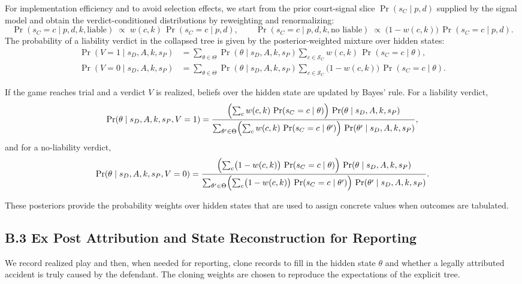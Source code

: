 \documentclass{article}
\begin{document}
For implementation efficiency and to avoid selection effects, we start from the prior court-signal slice $\Pr(s_C\mid p,d)$ supplied by the signal model and obtain the verdict-conditioned distributions by reweighting and renormalizing:
\[
\Pr(s_C=c\mid p,d,k,\text{liable}) \;\propto\; w(c,k)\,\Pr(s_C=c\mid p,d),\qquad
\Pr(s_C=c\mid p,d,k,\text{no liable}) \;\propto\; \bigl(1-w(c,k)\bigr)\,\Pr(s_C=c\mid p,d).
\]
The probability of a liability verdict in the collapsed tree is given by the posterior-weighted mixture over hidden states:
\begin{align*}
\Pr(V=1 \mid s_D, A, k, s_P)
  &= \sum_{\theta\in\Theta} 
       \Pr(\theta \mid s_D, A, k, s_P)
       \sum_{c\in\mathcal{S}_C} 
          w(c,k)\,\Pr(s_C=c\mid \theta), \\[6pt]
\Pr(V=0 \mid s_D, A, k, s_P)
  &= \sum_{\theta\in\Theta} 
       \Pr(\theta \mid s_D, A, k, s_P)
       \sum_{c\in\mathcal{S}_C} 
          \bigl(1-w(c,k)\bigr)\,\Pr(s_C=c\mid \theta).
\end{align*}

If the game reaches trial and a verdict $V$ is realized, beliefs over the hidden state are updated by Bayes’ rule. For a liability verdict,
\[
\Pr(\theta \mid s_D, A, k, s_P, V=1)
= \frac{\Bigl(\sum_{c} w(c,k)\,\Pr(s_C=c\mid \theta)\Bigr)\,
       \Pr(\theta \mid s_D, A, k, s_P)}
       {\sum_{\theta'\in\Theta}\Bigl(\sum_{c} w(c,k)\,\Pr(s_C=c\mid \theta')\Bigr)\,
        \Pr(\theta' \mid s_D, A, k, s_P)},
\]
and for a no‑liability verdict,
\[
\Pr(\theta \mid s_D, A, k, s_P, V=0)
= \frac{\Bigl(\sum_{c} \bigl(1-w(c,k)\bigr)\,\Pr(s_C=c\mid \theta)\Bigr)\,
       \Pr(\theta \mid s_D, A, k, s_P)}
       {\sum_{\theta'\in\Theta}\Bigl(\sum_{c} \bigl(1-w(c,k)\bigr)\,\Pr(s_C=c\mid \theta')\Bigr)\,
        \Pr(\theta' \mid s_D, A, k, s_P)}.
\]

These posteriors provide the probability weights over hidden states that are used to assign concrete values when outcomes are tabulated.

\subsection*{B.3 Ex Post Attribution and State Reconstruction for Reporting}

We record realized play and then, when needed for reporting, clone records to fill in the hidden state $\theta$ and whether a legally attributed accident is truly caused by the defendant. The cloning weights are chosen to reproduce the expectations of the explicit tree.
\end{document}
